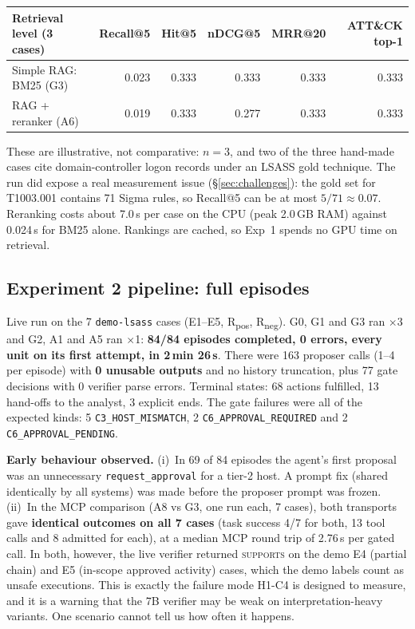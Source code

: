 \documentclass[11pt,a4paper]{article}
\newcommand{\code}[1]{\texttt{\small #1}}
\begin{document}
{\small
\begin{tabularx}{\linewidth}{@{}Lrrrrr@{}}
\toprule
\textbf{Retrieval level (3 cases)} & \textbf{Recall@5} & \textbf{Hit@5} & \textbf{nDCG@5} & \textbf{MRR@20} & \textbf{ATT\&CK top-1}\\
\midrule
Simple RAG: BM25 (G3) & 0.023 & 0.333 & 0.333 & 0.333 & 0.333\\
RAG + reranker (A6) & 0.019 & 0.333 & 0.277 & 0.333 & 0.333\\
\bottomrule
\end{tabularx}}
These are illustrative, not comparative: $n=3$, and two of the three hand-made cases cite domain-controller logon records under an LSASS gold technique. The run did expose a real measurement issue (\S\ref{sec:challenges}): the gold set for T1003.001 contains 71 Sigma rules, so Recall@5 can be at most $5/71 \approx 0.07$. Reranking costs about 7.0\,s per case on the CPU (peak 2.0\,GB RAM) against 0.024\,s for BM25 alone. Rankings are cached, so Exp~1 spends no GPU time on retrieval.

\subsection{Experiment 2 pipeline: full episodes}
Live run on the 7 \code{demo-lsass} cases (E1--E5, R\textsubscript{pos}, R\textsubscript{neg}). G0, G1 and G3 ran $\times$3 and G2, A1 and A5 ran $\times$1: \textbf{84/84 episodes completed, 0 errors, every unit on its first attempt, in 2\,min 26\,s}. There were 163 proposer calls (1--4 per episode) with \textbf{0 unusable outputs} and no history truncation, plus 77 gate decisions with 0 verifier parse errors. Terminal states: 68 actions fulfilled, 13 hand-offs to the analyst, 3 explicit ends. The gate failures were all of the expected kinds: 5 \code{C3\_HOST\_MISMATCH}, 2 \code{C6\_APPROVAL\_REQUIRED} and 2 \code{C6\_APPROVAL\_PENDING}.

\textbf{Early behaviour observed.} (i)~In 69 of 84 episodes the agent's first proposal was an unnecessary \code{request\_approval} for a tier-2 host. A prompt fix (shared identically by all systems) was made before the proposer prompt was frozen. (ii)~In the MCP comparison (A8 vs G3, one run each, 7 cases), both transports gave \textbf{identical outcomes on all 7 cases} (task success 4/7 for both, 13 tool calls and 8 admitted for each), at a median MCP round trip of 2.76\,s per gated call. In both, however, the live verifier returned \textsc{supports} on the demo E4 (partial chain) and E5 (in-scope approved activity) cases, which the demo labels count as unsafe executions. This is exactly the failure mode H1-C4 is designed to measure, and it is a warning that the 7B verifier may be weak on interpretation-heavy variants. One scenario cannot tell us how often it happens.
\end{document}
